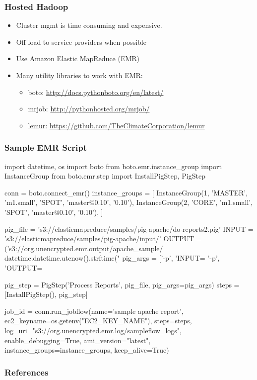 \documentclass{beamer}
\begin{document}
\frame 
{
  \frametitle{Hosted Hadoop}
  \begin{itemize}
    \item Cluster mgmt is time consuming and expensive.
    \item Off load to service providers when possible
    \item Use Amazon Elastic MapReduce (EMR)
    \item Many utility libraries to work with EMR:
      \begin{itemize}
        \item boto: \url{http://docs.pythonboto.org/en/latest/}
        \item mrjob: \url{http://pythonhosted.org/mrjob/}
        \item lemur: \url{https://github.com/TheClimateCorporation/lemur}
      \end{itemize}
  \end{itemize}
}

\begin{frame}[fragile]
  \frametitle{Sample EMR Script}
  \begin{python}
    import datetime, os
    import boto
    from boto.emr.instance_group import InstanceGroup
    from boto.emr.step import InstallPigStep, PigStep

    conn = boto.connect_emr()
    instance_groups = [
        InstanceGroup(1, 'MASTER', 'm1.small', 'SPOT', 'master@0.10', '0.10'),
        InstanceGroup(2, 'CORE', 'm1.small', 'SPOT', 'master@0.10', '0.10'),
        ]

    pig_file = 's3://elasticmapreduce/samples/pig-apache/do-reports2.pig'
    INPUT = 's3://elasticmapreduce/samples/pig-apache/input/'
    OUTPUT = ('s3://org.unencrypted.emr.output/apache_sample/%
              datetime.datetime.utcnow().strftime("%
    pig_args = ['-p', 'INPUT=%
                '-p', 'OUTPUT=%

    pig_step = PigStep('Process Reports', pig_file, pig_args=pig_args)
    steps = [InstallPigStep(), pig_step]

    job_id = conn.run_jobflow(name='sample apache report',
        ec2_keyname=os.getenv("EC2_KEY_NAME"), steps=steps,
        log_uri="s3://org.unencrypted.emr.log/sampleflow_logs", enable_debugging=True,
        ami_version="latest", instance_groups=instance_groups, keep_alive=True)
  \end{python}
\end{frame}

\frame
{
  \frametitle{References}
  \printbibliography
}
\end{document}
